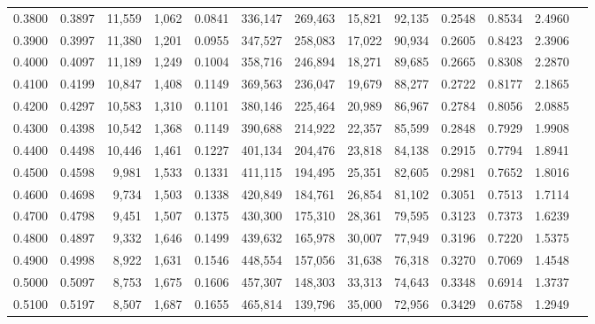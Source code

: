 \begin{tabular}{rrrrrrrrrrrrr}
0.3800 & 0.3897 & 11,559 & 1,062 &                                     0.0841 & 336,147 & 269,463 &  15,821 &  92,135 & 0.2548 & 0.8534 & 2.4960 \\
0.3900 & 0.3997 & 11,380 & 1,201 &                                     0.0955 & 347,527 & 258,083 &  17,022 &  90,934 & 0.2605 & 0.8423 & 2.3906 \\
0.4000 & 0.4097 & 11,189 & 1,249 &                                     0.1004 & 358,716 & 246,894 &  18,271 &  89,685 & 0.2665 & 0.8308 & 2.2870 \\
0.4100 & 0.4199 & 10,847 & 1,408 &                                     0.1149 & 369,563 & 236,047 &  19,679 &  88,277 & 0.2722 & 0.8177 & 2.1865 \\
0.4200 & 0.4297 & 10,583 & 1,310 &                                     0.1101 & 380,146 & 225,464 &  20,989 &  86,967 & 0.2784 & 0.8056 & 2.0885 \\
0.4300 & 0.4398 & 10,542 & 1,368 &                                     0.1149 & 390,688 & 214,922 &  22,357 &  85,599 & 0.2848 & 0.7929 & 1.9908 \\
0.4400 & 0.4498 & 10,446 & 1,461 &                                     0.1227 & 401,134 & 204,476 &  23,818 &  84,138 & 0.2915 & 0.7794 & 1.8941 \\
0.4500 & 0.4598 &  9,981 & 1,533 &                                     0.1331 & 411,115 & 194,495 &  25,351 &  82,605 & 0.2981 & 0.7652 & 1.8016 \\
0.4600 & 0.4698 &  9,734 & 1,503 &                                     0.1338 & 420,849 & 184,761 &  26,854 &  81,102 & 0.3051 & 0.7513 & 1.7114 \\
0.4700 & 0.4798 &  9,451 & 1,507 &                                     0.1375 & 430,300 & 175,310 &  28,361 &  79,595 & 0.3123 & 0.7373 & 1.6239 \\
0.4800 & 0.4897 &  9,332 & 1,646 &                                     0.1499 & 439,632 & 165,978 &  30,007 &  77,949 & 0.3196 & 0.7220 & 1.5375 \\
0.4900 & 0.4998 &  8,922 & 1,631 &                                     0.1546 & 448,554 & 157,056 &  31,638 &  76,318 & 0.3270 & 0.7069 & 1.4548 \\
0.5000 & 0.5097 &  8,753 & 1,675 &                                     0.1606 & 457,307 & 148,303 &  33,313 &  74,643 & 0.3348 & 0.6914 & 1.3737 \\
0.5100 & 0.5197 &  8,507 & 1,687 &                                     0.1655 & 465,814 & 139,796 &  35,000 &  72,956 & 0.3429 & 0.6758 & 1.2949 \\

\end{tabular}
